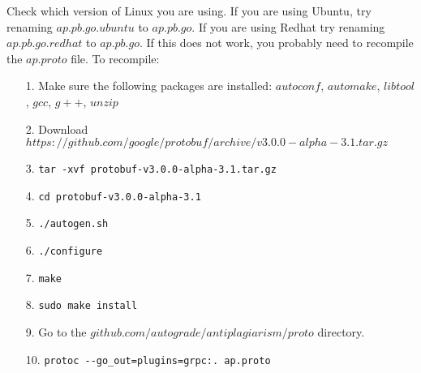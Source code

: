 \documentclass[12pt]{article}
\begin{document}
		Check which version of Linux you are using. If you are using Ubuntu, try renaming $ap.pb.go.ubuntu$ to $ap.pb.go$. If you are using Redhat try renaming $ap.pb.go.redhat$ to $ap.pb.go$. If this does not work, you probably need to recompile the $ap.proto$ file. To recompile:
		
		\begin{itemize}
		\item[1.] Make sure the following packages are installed: $autoconf$, $automake$, $libtool$, $gcc$, $g++$, $unzip$
		\item[2.] Download $https://github.com/google/protobuf/archive/v3.0.0-alpha-3.1.tar.gz$
		\item[3.] \verb|tar -xvf protobuf-v3.0.0-alpha-3.1.tar.gz|
		\item[4.] \verb|cd protobuf-v3.0.0-alpha-3.1|
		\item[5.] \verb|./autogen.sh|
		\item[6.] \verb|./configure|
		\item[7.] \verb|make|
		\item[8.] \verb|sudo make install|
		\item[9.] Go to the $github.com/autograde/antiplagiarism/proto$ directory.
		\item[10.] \verb|protoc --go_out=plugins=grpc:. ap.proto|	
		\end{itemize}
\end{document}
